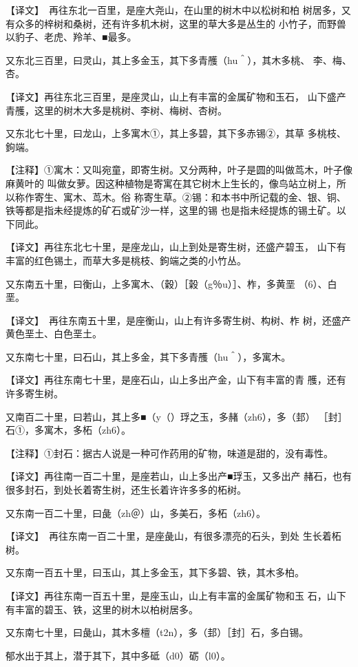 \documentclass[a4paper,12pt,UTF8,twoside]{ctexbook}
\begin{document}
【译文】　再往东北一百里，是座大尧山，在山里的树木中以松树和柏 树居多，又有众多的梓树和桑树，还有许多机木树，这里的草大多是丛生的 小竹子，而野兽以豹子、老虎、羚羊、■最多。

又东北三百里，曰灵山，其上多金玉，其下多青雘（hu＾），其木多桃、 李、梅、杏。

【译文】再往东北三百里，是座灵山，山上有丰富的金属矿物和玉石， 山下盛产青雘，这里的树木大多是桃树、李树、梅树、杏树。

又东北七十里，曰龙山，上多寓木①，其上多碧，其下多赤锡②，其草 多桃枝、鉤端。

【注释】①寓木：又叫宛童，即寄生树。又分两种，叶子是圆的叫做茑木，叶子像麻黄叶的 叫做女萝。因这种植物是寄寓在其它树木上生长的，像鸟站立树上，所以称作寄生、寓木、茑木。俗 称寄生草。②锡：和本书中所记载的金、银、铜、铁等都是指未经提炼的矿石或矿沙一样，这里的锡 也是指未经提炼的锡土矿。以下同此。

【译文】再往东北七十里，是座龙山，山上到处是寄生树，还盛产碧玉， 山下有丰富的红色锡土，而草大多是桃枝、鉤端之类的小竹丛。

又东南五十里，曰衡山，上多寓木、（穀）［榖（g％u）］、柞，多黄垩 （6）、白垩。

【译文】　再往东南五十里，是座衡山，山上有许多寄生树、构树、柞 树，还盛产黄色垩土、白色垩土。

又东南七十里，曰石山，其上多金，其下多青雘（hu＾），多寓木。

【译文】再往东南七十里，是座石山，山上多出产金，山下有丰富的青 雘，还有许多寄生树。

又南百二十里，曰若山，其上多■（y（）琈之玉，多赭（zh6），多（邽） ［封］石①，多寓木，多柘（zh6）。

【注释】①封石：据古人说是一种可作药用的矿物，味道是甜的，没有毒性。

【译文】再往南一百二十里，是座若山，山上多出产■琈玉，又多出产 赭石，也有很多封石，到处长着寄生树，还生长着许许多多的柘树。

又东南一百二十里，曰彘（zh＠）山，多美石，多柘（zh6）。

【译文】　再往东南一百二十里，是座彘山，有很多漂亮的石头，到处 生长着柘树。

又东南一百五十里，曰玉山，其上多金玉，其下多碧、铁，其木多柏。

【译文】再往东南一百五十里，是座玉山，山上有丰富的金属矿物和玉 石，山下有丰富的碧玉、铁，这里的树木以柏树居多。

又东南七十里，曰彘山，其木多檀（t2n），多（邽）［封］石，多白锡。

郁水出于其上，潜于其下，其中多砥（d0）砺（l0）。
\end{document}
